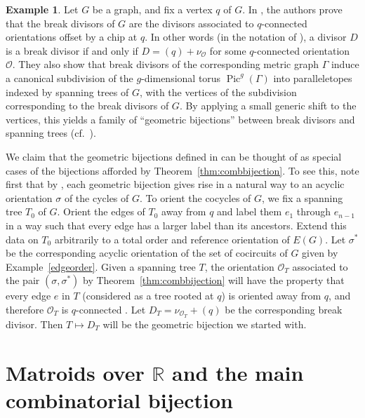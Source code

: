 \documentclass[12pt]{amsart}
\numberwithin{equation}{section}
\theoremstyle{definition}
\newtheorem{example}[theorem]{Example}
\newcommand{\Pic}{\operatorname{Pic}}
\begin{document}
\begin{example}
Let $G$ be a graph, and fix a vertex $q$ of $G$. In \cite{an2014canonical}, the authors prove that the break divisors of $G$ are the divisors associated to $q$-connected orientations offset by a chip at $q$. In other words (in the notation of \cite[Lemma 3.3]{an2014canonical}), a divisor $D$ is a break divisor if and only if $D = (q) + \nu_{\mathcal O}$ for some $q$-connected orientation $\mathcal O$.   They also show that break divisors of the corresponding metric graph $\Gamma$ induce a canonical subdivision of the $g$-dimensional torus $\Pic^g(\Gamma)$ into paralleletopes indexed by spanning trees of $G$, with the vertices of the subdivision corresponding to the break divisors of $G$. By applying a small generic shift to the vertices, this yields a family of ``geometric bijections'' between break divisors and spanning trees (cf.~\cite[Remark 4.26]{an2014canonical}).

We claim that the geometric bijections defined in \cite{an2014canonical} can be thought of as special cases of the bijections afforded by Theorem~\ref{thm:combbijection}.  To see this,
note first that by \cite[Theorem 10]{yuen2015geometric}, each geometric bijection gives rise in a natural way to an acyclic orientation $\sigma$ of the cycles of $G$.  To orient the cocycles of $G$, we fix a spanning tree $T_0$ of $G$.  Orient the edges of $T_0$ away from $q$ and label them $e_1$ through $e_{n-1}$ in a way such that every edge has a larger label than its ancestors.  Extend this data on $T_0$ arbitrarily to a total order and reference orientation of $E(G)$.  Let $\sigma^*$ be the corresponding acyclic orientation of the set of cocircuits of $G$ given by Example~\ref{edgeorder}.  
Given a spanning tree $T$, the orientation $\mathcal{O}_T$ associated to the pair $(\sigma,\sigma^*)$ by Theorem~\ref{thm:combbijection} will have the property that every edge $e$ in $T$ (considered as a tree rooted at $q$) is oriented away from $q$, and therefore $\mathcal{O}_T$ is $q$-connected \cite[Section 3]{backman2014partial}.  Let $D_T = \nu_{\mathcal{O}_T} + (q)$ be the corresponding break divisor.
Then $T \mapsto D_T$ will be the geometric bijection we started with.
\end{example}


\section{Matroids over $\mathbb{R}$ and the main combinatorial bijection}\label{sec:proof}
\end{document}

